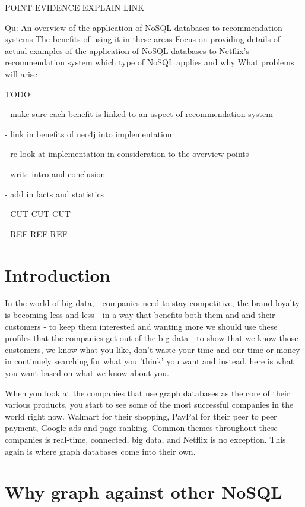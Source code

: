 \documentclass[a4paper]{article}
\begin{document}
\justify

POINT
EVIDENCE
EXPLAIN
LINK

Qu:
An overview of the application of NoSQL databases to recommendation systems
    The benefits of using it in these areas
Focus on providing details of actual examples of the application of NoSQL databases to Netflix's recommendation system
    which type of NoSQL applies and why
    What problems will arise
\par
TODO: \par
- make sure each benefit is linked to an aspect of recommendation system \par
- link in benefits of neo4j into implementation \par
    - re look at implementation in consideration to the overview points \par
- write intro and conclusion \par
- add in facts and statistics \par
- CUT CUT CUT \par
- REF REF REF \par


\section{Introduction}
\label{sec:Introduction}
In the world of big data,
- companies need to stay competitive, the brand loyalty is becoming less and less
- in a way that benefits both them and and their customers
- to keep them interested and wanting more we should use these profiles that the companies get out of the big data
- to show that we know those customers, we know what you like, don't waste your time and our time or money in continuely searching for what you 'think' you want and instead, here is what you want based on what we know about you.

When you look at the companies that use graph databases as the core of their various products, you start to see some of the most successful companies in the world right now. Walmart for their shopping, PayPal for their peer to peer payment, Google ads and page ranking. Common themes throughout these companies is real-time, connected, big data, and Netflix is no exception. This again is where graph databases come into their own.

\section{Why graph against other NoSQL}
\label{sec:Why graph against other NoSQL}
\end{document}
